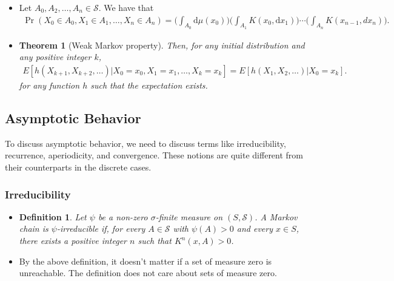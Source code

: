 \documentclass[10pt]{article}
\newtheorem{theorem}[lemma]{Theorem}
\newtheorem{definition}[lemma]{Definition}
\newcommand{\dee}{\mathrm{d}}
\newcommand{\mcal}[1]{\mathcal{#1}}
\begin{document}
\begin{itemize}
  \item Let $A_0, A_2, \dotsc, A_n \in \mcal{S}$. We have that
  \begin{align*}
    \Pr(X_0 \in A_0, X_1 \in A_1, \dotsc, X_n \in A_n)
    = \bigg( \int_{A_0} \dee\mu(x_0) \bigg) \bigg( \int_{A_1} K(x_0, \dee x_1) \bigg) \dotsb \bigg( \int_{A_n} K(x_{n-1}, dx_n) \bigg).
  \end{align*}

  \item \begin{theorem}[Weak Markov property]
    Then, for any initial distribution and any positive integer $k$,
    \begin{align*}
      E[h(X_{k+1}, X_{k+2}, \dotsc)|X_0 = x_0, X_1 = x_1, \dotsc, X_k = x_k]  = E[h(X_1, X_2, \dotsc) | X_0 = x_k].
    \end{align*}
    for any function $h$ such that the expectation exists.
  \end{theorem}
\end{itemize}

\subsection{Asymptotic Behavior}

To discuss asymptotic behavior, we need to discuss terms like irreducibility, recurrence, aperiodicity, and convergence. These notions are quite different from their counterparts in the discrete cases.

\subsubsection{Irreducibility}

\begin{itemize}
  \item \begin{definition}
    Let $\psi$ be a non-zero $\sigma$-finite measure on $(S, \mcal{S})$. A Markov chain is $\psi$-irreducible if, for every $A \in \mcal{S}$ with $\psi(A) > 0$ and every $x \in S$, there exists a positive integer $n$ such that $K^n(x, A) > 0$.
  \end{definition}

  \item By the above definition, it doesn't matter if a set of measure zero is unreachable. The definition does not care about sets of measure zero.
  
\end{itemize}
\end{document}
